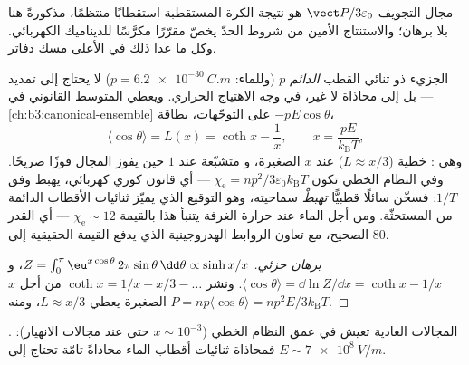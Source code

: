\begin{remark}
مجال التجويف $\vect P/3\varepsilon_0$ هو نتيجة الكرة المستقطبة
استقطابًا منتظمًا، مذكورةً هنا بلا برهان؛ والاستنتاج الأمين من شروط
الحدّ يخصّ مقرّرًا مكرَّسًا للديناميك الكهربائي. وكل ما
عدا ذلك في الأعلى مسك دفاتر.
\end{remark}

\begin{proposition}\label{prop:b3:electromagnetism-in-matter:langevin}
الجزيء ذو ثنائي القطب \emph{الدائم} $p$ (وللماء:
$p = \qty{6.2e-30}{C.m}$) لا يحتاج إلى تمديد --- بل إلى محاذاة
لا غير، في وجه الاهتياج الحراري. ويعطي المتوسط القانوني في
\cref{ch:b3:canonical-ensemble} على التوجّهات، بطاقة
$-pE\cos\theta$،
\[
\langle\cos\theta\rangle = L(x) = \coth x - \frac1x ,
\qquad x = \frac{pE}{k_{\text{B}}T} ,
\]
وهي \emph{}: خطية ($L \approx x/3$) عند $x$ الصغيرة، و
متشبّعة عند $1$ حين يفوز المجال فوزًا صريحًا. وفي النظام الخطي
تكون $\chi_{\text{e}} = np^2/3\varepsilon_0k_{\text{B}}T$ --- أي قانون
كوري كهربائي، يهبط وفق $1/T$: فسخّن سائلًا قطبيًّا \emph{تهبطْ}
سماحيته، وهو التوقيع الذي يميّز ثنائيات الأقطاب الدائمة من المستحثّة.
ومن أجل الماء عند حرارة الغرفة يتنبأ هذا بالقيمة
$\chi_{\text{e}} \sim 12$ --- أي القدر الصحيح، مع تعاون الروابط
الهدروجينية الذي يدفع القيمة الحقيقية إلى $80$.
\end{proposition}

\begin{proof}[برهان جزئي]
$Z = \int_0^\pi \eu^{x\cos\theta}\,2\pi\sin\theta\,\dd\theta \propto
\sinh x/x$، و $\langle\cos\theta\rangle = \dd\ln Z/\dd x = \coth x
- 1/x$. ونشر $\coth x = 1/x + x/3 - \dots$ من أجل $x$ الصغيرة يعطي
$L \approx x/3$، ومنه $P = np\langle\cos\theta\rangle =
np^2E/3k_{\text{B}}T$.
\end{proof}

\begin{omfigure}

{\small {}. المجالات العادية تعيش في عمق
النظام الخطي ($x \sim 10^{-3}$ حتى عند مجالات الانهيار): فمحاذاة
ثنائيات أقطاب الماء محاذاةً تامّة تحتاج إلى
$E \sim \qty{7e8}{V/m}$.}
\end{omfigure}

